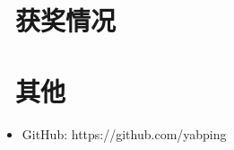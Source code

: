 \documentclass{resume}
\begin{document}
\section{\faHeartO\ 获奖情况}

\section{\faInfo\ 其他}
\begin{itemize}[parsep=0.5ex]
  \item GitHub: https://github.com/yabping
\end{itemize}

%
%
\end{document}
